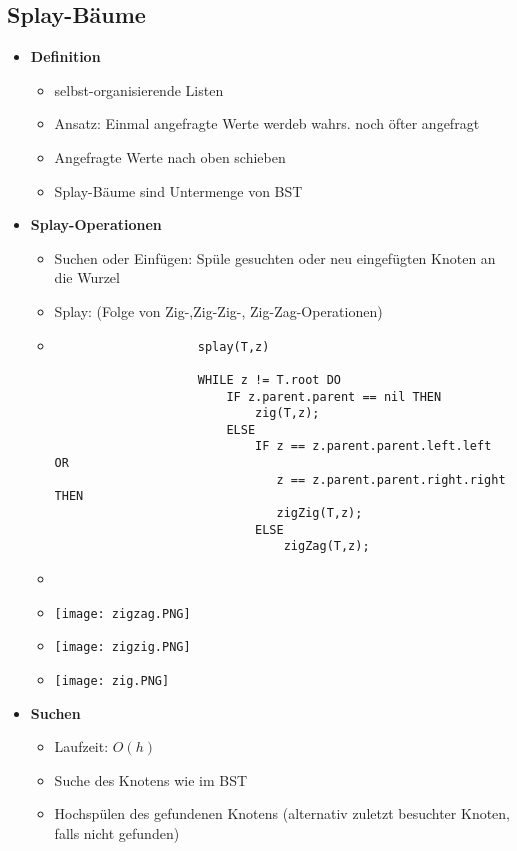 \subsection{Splay-Bäume}
    \begin{itemize}
        \item \textbf{Definition}
            \begin{itemize}
                \item selbst-organisierende Listen
                \item Ansatz: Einmal angefragte Werte werdeb wahrs. noch öfter angefragt
                \item Angefragte Werte nach oben schieben
                \item Splay-Bäume sind Untermenge von BST
            \end{itemize}
        
        \item \textbf{Splay-Operationen}
            \begin{itemize}
                \item Suchen oder Einfügen: Spüle gesuchten oder neu eingefügten Knoten an die Wurzel
                \item Splay: (Folge von Zig-,Zig-Zig-, Zig-Zag-Operationen)
                \item []
                    \begin{verbatim}
                    splay(T,z)

                    WHILE z != T.root DO
                        IF z.parent.parent == nil THEN
                            zig(T,z);
                        ELSE
                            IF z == z.parent.parent.left.left OR
                               z == z.parent.parent.right.right THEN
                               zigZig(T,z);
                            ELSE
                                zigZag(T,z);
                    \end{verbatim}
                \item[]
                \item[] \texttt{[image: zigzag.PNG]}
                \item[] \texttt{[image: zigzig.PNG]}
                \item[] \texttt{[image: zig.PNG]}
            \end{itemize}
        
        \item \textbf{Suchen}
            \begin{itemize}
                \item Laufzeit: $O(h)$
                \item Suche des Knotens wie im BST
                \item Hochspülen des gefundenen Knotens (alternativ zuletzt besuchter Knoten, falls nicht gefunden)
            \end{itemize}


\end{itemize}
